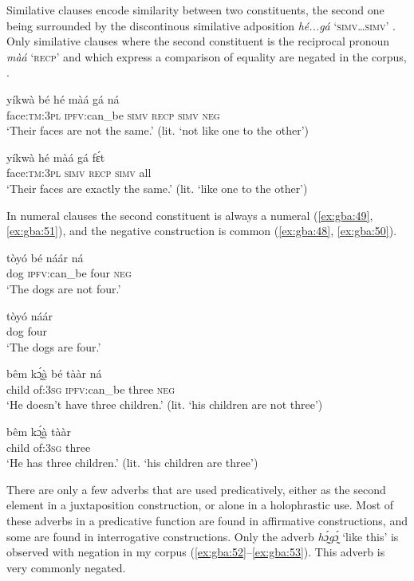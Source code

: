 \documentclass[output=paper,colorlinks=true, citecolor=brown]{langscibook}
\begin{document}
Similative clauses encode similarity between two constituents, the second one being surrounded by the discontinous similative adposition \textit{hé...gá} ‘\textsc{simv}…\textsc{simv}’ . Only similative clauses where the second constituent is the reciprocal pronoun \textit{màá} ‘\textsc{recp}’ and which express a comparison of equality are negated in the corpus, .

\ea\label{ex:gba:46}
    \gll yíkwà bé hé màá gá ná \\ 
         face:\textsc{tm}:3\textsc{pl} \textsc{ipfv}:can\_be \textsc{simv} \textsc{recp} \textsc{simv} \textsc{neg} \\
    \glt ‘Their faces are not the same.’ (lit. ‘not like one to the other’) 
\z 

\ea\label{ex:gba:47}
    \gll yíkwà hé màá gá fɛ́t \\ 
          face:\textsc{tm}:3\textsc{pl} \textsc{simv} \textsc{recp} \textsc{simv} all \\
    \glt ‘Their faces are exactly the same.’ (lit. ‘like one to the other’)
\z 

In numeral clauses the second constituent is always a numeral (\ref{ex:gba:49}, \ref{ex:gba:51}), and the negative construction is common (\ref{ex:gba:48}, \ref{ex:gba:50}). 

\ea\label{ex:gba:48}
    \gll tòyó bé náár ná  \\ 
         dog \textsc{ipfv}:can\_be four \textsc{neg}  \\
    \glt ‘The dogs are not four.’
\z 

\ea\label{ex:gba:49}
    \gll tòyó náár  \\ 
         dog four \\
    \glt ‘The dogs are four.’
\z 

\ea\label{ex:gba:50}
    \gll  bêm kɔ̰́à̰  bé tààr ná \\ 
         child of:3\textsc{sg} \textsc{ipfv}:can\_be three \textsc{neg} \\
    \glt ‘He doesn't have three children.’ (lit. ‘his children are not three’)
\z 

\ea\label{ex:gba:51}
    \gll bêm kɔ̰́à̰  tààr \\ 
         child of:3\textsc{sg} three \\
    \glt ‘He has three children.’ (lit. ‘his children are three’)
\z 

There are only a few adverbs that are used predicatively, either as the second element in a juxtaposition construction, or alone in a holophrastic use. Most of these adverbs in a predicative function are found in affirmative constructions, and some are found in interrogative constructions. Only the adverb \textit{hɔ̰́gɔ̰́} ‘like this’ is observed with negation in my corpus (\ref{ex:gba:52}--\ref{ex:gba:53}). This adverb is very commonly negated.
\end{document}

